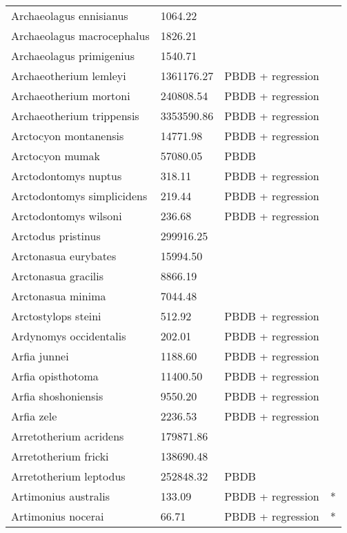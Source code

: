 \documentclass{article}
\begin{document}
\begin{center}
\begin{longtable}{p{} p{} p{} p{}}
    Archaeolagus ennisianus & 1064.22 & \cite{Tomiya2013} &  \\ 
    Archaeolagus macrocephalus & 1826.21 & \cite{Tomiya2013} &  \\ 
    Archaeolagus primigenius & 1540.71 & \cite{Tomiya2013} &  \\ 
    Archaeotherium lemleyi & 1361176.27 & PBDB + regression &  \\ 
    Archaeotherium mortoni & 240808.54 & PBDB + regression &  \\ 
    Archaeotherium trippensis & 3353590.86 & PBDB + regression &  \\ 
    Arctocyon montanensis & 14771.98 & PBDB + regression &  \\ 
    Arctocyon mumak & 57080.05 & PBDB &  \\ 
    Arctodontomys nuptus & 318.11 & PBDB + regression &  \\ 
    Arctodontomys simplicidens & 219.44 & PBDB + regression &  \\ 
    Arctodontomys wilsoni & 236.68 & PBDB + regression &  \\ 
    Arctodus pristinus & 299916.25 & \cite{Smith2004} &  \\ 
    Arctonasua eurybates & 15994.50 & \cite{Tomiya2013} &  \\ 
    Arctonasua gracilis & 8866.19 & \cite{Tomiya2013} &  \\ 
    Arctonasua minima & 7044.48 & \cite{Tomiya2013} &  \\ 
    Arctostylops steini & 512.92 & PBDB + regression &  \\ 
    Ardynomys occidentalis & 202.01 & PBDB + regression &  \\ 
    Arfia junnei & 1188.60 & PBDB + regression &  \\ 
    Arfia opisthotoma & 11400.50 & PBDB + regression &  \\ 
    Arfia shoshoniensis & 9550.20 & PBDB + regression &  \\ 
    Arfia zele & 2236.53 & PBDB + regression &  \\ 
    Arretotherium acridens & 179871.86 & \cite{Tomiya2013} &  \\ 
    Arretotherium fricki & 138690.48 & \cite{Tomiya2013} &  \\ 
    Arretotherium leptodus & 252848.32 & PBDB &  \\ 
    Artimonius australis & 133.09 & PBDB + regression & * \\ 
    Artimonius nocerai & 66.71 & PBDB + regression & * \\ 

\end{longtable}
\end{center}
\end{document}
